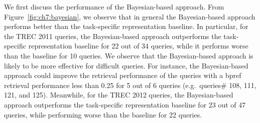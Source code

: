 \documentclass[1p]{elsarticle}
\begin{document}
We first discuss the performance of the Bayesian-based approach. From Figure~\ref{fig:ch7:bayesian}, we observe that in general the Bayesian-based approach performs better than the task-specific representation baseline. In particular, for the TREC 2011 queries, the Bayesian-based approach outperforms the task-specific representation baseline for 22 out of 34 queries, while it performs worse than the baseline for 10 queries. We observe that the Bayesian-based approach is likely to be more effective for difficult queries. For instance, the Bayesian-based approach could improve the retrieval performance of the queries with a bpref retrieval performance less than 0.25 for 5 out of 6 queries (e.g.\ queries\# 108, 111, 121, and 125). Meanwhile, for the TREC 2012 queries, the Bayesian-based approach outperforms the task-specific representation baseline for 23 out of 47 queries, while performing worse than the baseline for 22 queries.


%
\end{document}

